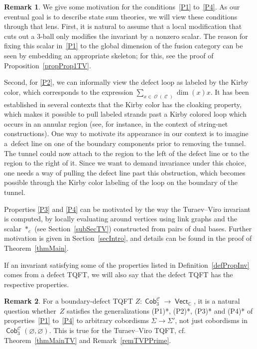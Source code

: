 \documentclass[10pt,a4paper]{amsart}
\DeclareMathOperator{\vect}{\mathsf{Vect}}
\DeclareMathOperator{\C}{\mathbb{C}}
\DeclareMathOperator{\Cob}{\mathsf{Cob}}
\DeclareMathOperator{\calc}{\mathcal{C}}
\DeclareMathOperator{\calo}{\mathcal{O}}
\numberwithin{equation}{section}
\theoremstyle{definition}
\newtheorem{Remark}[Remark]{Remark}
\begin{document}
\begin{Remark}
 \label{remDef}
 We give some motivation for the conditions~\ref{P1} to~\ref{P4}. As our eventual goal is to describe state sum theories, we will view these conditions through that lens. First, it is natural to assume that a local modification that cuts out a 3-ball only modifies the invariant by a nonzero scalar. The reason for fixing this scalar in~\ref{P1} to the global dimension of the fusion category can be seen by embedding an appropriate skeleton; for this, see the proof of Proposition~\ref{propProp1TV}.

 Second, for \ref{P2}, we can informally view the defect loop as labeled by the Kirby color, which corresponds to the expression $\sum_{x \in \calo(\calc)}\dim(x) x$. It has been established in several contexts that the Kirby color has the cloaking property, which makes it possible to pull labeled strands past a Kirby colored loop which occurs in an annular region (see, for instance, \cite{Ba, CGPV} in the context of string-net constructions). One way to motivate its appearance in our context is to imagine a~defect line on one of the boundary components prior to removing the tunnel. The tunnel could now attach to the region to the left of the defect line or to the region to the right of it. Since we want to demand invariance under this choice, one needs a way of pulling the defect line past this obstruction, which becomes possible through the Kirby color labeling of the loop on the boundary of the tunnel.

 Properties \ref{P3} and \ref{P4} can be motivated by the way the Turaev–Viro invariant is computed, by locally evaluating around vertices using link graphs and the scalar $*_c$ (see Section~\ref{subSecTV}) constructed from pairs of dual bases. Further motivation is given in Section~\ref{secIntro}, and details can be found in the proof of Theorem~\ref{thmMain}.
\end{Remark}
If an invariant satisfying some of the properties listed in Definition~\ref{defPropInv} comes from a defect TQFT, we will also say that the defect TQFT has the respective properties.
\begin{Remark}
 \label{remPPrime}
 For a boundary-defect TQFT $Z\colon \Cob_3^{\calc} \!\rightarrow\! \vect_{\C}$, it is a natural question whether~$Z$ satisfies the generalizations (P1)*, (P2)*, (P3)* and (P4)* of properties~\ref{P1} to~\ref{P4} to arbitrary cobordisms $\Sigma \rightarrow \Sigma'$, not just cobordisms in $\Cob_3^{\calc}(\varnothing, \varnothing)$. This is true for the Turaev--Viro TQFT, cf. Theorem~\ref{thmMainTV} and Remark~\ref{remTVPPrime}.
\end{Remark}
\end{document}
